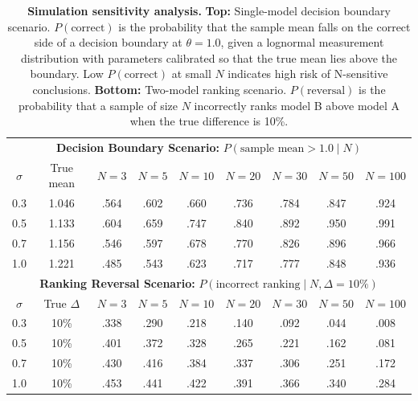 \documentclass[11pt]{article}
\begin{document}
\begin{table}[h]
\centering
\caption{\textbf{Simulation sensitivity analysis.} \textbf{Top:} Single-model decision boundary scenario. $P(\text{correct})$ is the probability that the sample mean falls on the correct side of a decision boundary at $\theta{=}1.0$, given a lognormal measurement distribution with parameters calibrated so that the true mean lies above the boundary. Low $P(\text{correct})$ at small $N$ indicates high risk of N-sensitive conclusions. \textbf{Bottom:} Two-model ranking scenario. $P(\text{reversal})$ is the probability that a sample of size $N$ incorrectly ranks model B above model A when the true difference is 10\%.}
\label{tab:sensitivity}
\begin{tabular}{@{}c c c c c c c c c@{}}
\toprule
\multicolumn{9}{c}{\textbf{Decision Boundary Scenario:} $P(\text{sample mean} > 1.0 \mid N)$} \\
$\sigma$ & True mean & $N{=}3$ & $N{=}5$ & $N{=}10$ & $N{=}20$ & $N{=}30$ & $N{=}50$ & $N{=}100$ \\
\midrule
0.3 & 1.046 & .564 & .602 & .660 & .736 & .784 & .847 & .924 \\
0.5 & 1.133 & .604 & .659 & .747 & .840 & .892 & .950 & .991 \\
0.7 & 1.156 & .546 & .597 & .678 & .770 & .826 & .896 & .966 \\
1.0 & 1.221 & .485 & .543 & .623 & .717 & .777 & .848 & .936 \\
\midrule
\multicolumn{9}{c}{\textbf{Ranking Reversal Scenario:} $P(\text{incorrect ranking} \mid N, \Delta{=}10\%)$} \\
$\sigma$ & True $\Delta$ & $N{=}3$ & $N{=}5$ & $N{=}10$ & $N{=}20$ & $N{=}30$ & $N{=}50$ & $N{=}100$ \\
\midrule
0.3 & 10\% & .338 & .290 & .218 & .140 & .092 & .044 & .008 \\
0.5 & 10\% & .401 & .372 & .328 & .265 & .221 & .162 & .081 \\
0.7 & 10\% & .430 & .416 & .384 & .337 & .306 & .251 & .172 \\
1.0 & 10\% & .453 & .441 & .422 & .391 & .366 & .340 & .284 \\
\bottomrule
\end{tabular}
\end{table}
\end{document}
